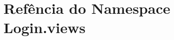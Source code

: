 \hypertarget{namespaceLogin_1_1views}{\section{Refência do Namespace Login.\-views}
\label{d9/d37/namespaceLogin_1_1views}
}
